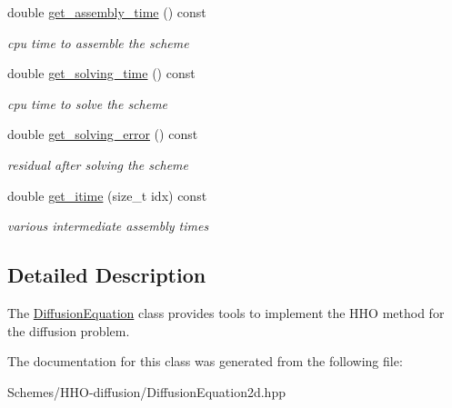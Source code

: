 \begin{DoxyCompactItemize}
double \hyperlink{group__HHO__diffusion_gad295fde4e7f6dfb97a1f25f7d244e1fb}{get\+\_\+assembly\+\_\+time} () const
\begin{DoxyCompactList}\small\item\em cpu time to assemble the scheme \end{DoxyCompactList}\item 
double \hyperlink{group__HHO__diffusion_gadaf75d443cbf042a1ab65f2953350499}{get\+\_\+solving\+\_\+time} () const
\begin{DoxyCompactList}\small\item\em cpu time to solve the scheme \end{DoxyCompactList}\item 
double \hyperlink{group__HHO__diffusion_ga630e8768b1d21686fac8ace701fb7f25}{get\+\_\+solving\+\_\+error} () const
\begin{DoxyCompactList}\small\item\em residual after solving the scheme \end{DoxyCompactList}\item 
double \hyperlink{group__HHO__diffusion_ga0b37dd7fcb623ae4e6679cd9eed55a50}{get\+\_\+itime} (size\+\_\+t idx) const
\begin{DoxyCompactList}\small\item\em various intermediate assembly times \end{DoxyCompactList}\end{DoxyCompactItemize}


\subsection{Detailed Description}
The \hyperlink{classHArDCore2D_1_1DiffusionEquation}{Diffusion\+Equation} class provides tools to implement the H\+HO method for the diffusion problem. 

The documentation for this class was generated from the following file\+:\begin{DoxyCompactItemize}
\item 
Schemes/\+H\+H\+O-\/diffusion/Diffusion\+Equation2d.\+hpp\end{DoxyCompactItemize}
